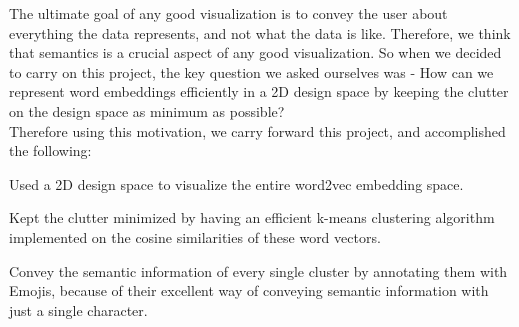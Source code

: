 The ultimate goal of any good visualization is to convey the user about everything the data represents, and not what the data is like. Therefore, we think that semantics is a crucial aspect of any good visualization. So when we decided to carry on this project, the key question we asked ourselves was - How can we represent word embeddings efficiently in a 2D design space by keeping the clutter on the design space as minimum as possible? \\
Therefore using this motivation, we carry forward this project, and accomplished the following:
\begin{itemize*}
 \item Used a 2D design space to visualize the entire word2vec embedding space.
 \item Kept the clutter minimized by having an efficient k-means clustering algorithm implemented on the cosine similarities of these word vectors.
 \item Convey the semantic information of every single cluster by annotating them with Emojis, because of their excellent way of conveying semantic information with just a single character.
\end{itemize*}
